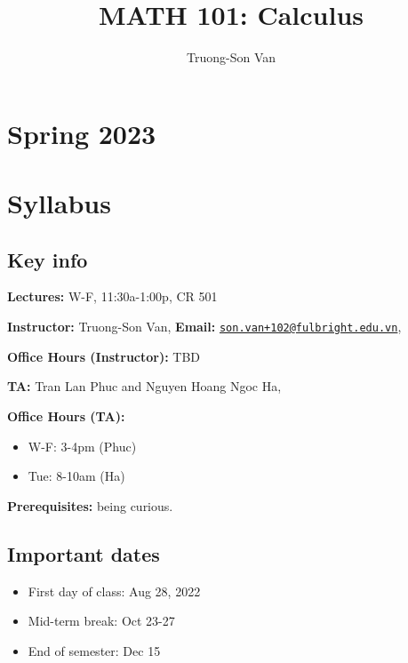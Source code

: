 \documentclass[
]{article}
\title{MATH 101: Calculus}
\author{Truong-Son Van}
\date{}
\providecommand{\tightlist}{%
  \setlength{\itemsep}{0pt}\setlength{\parskip}{0pt}}
\begin{document}
\maketitle

{
\setcounter{tocdepth}{2}
\tableofcontents
}
\hypertarget{spring-2023}{%
\section*{Spring 2023}\label{spring-2023}}

\hypertarget{syllabus}{%
\section*{Syllabus}\label{syllabus}}

\hypertarget{key-info}{%
\subsection*{Key info}\label{key-info}}

\textbf{Lectures:} W-F, 11:30a-1:00p, CR 501

\textbf{Instructor:} Truong-Son Van, \textbf{Email:} \href{mailto:son.van+102@fulbright.edu.vn}{\nolinkurl{son.van+102@fulbright.edu.vn}},

\textbf{Office Hours (Instructor):} TBD

\textbf{TA:} Tran Lan Phuc and Nguyen Hoang Ngoc Ha,

\textbf{Office Hours (TA):}

\begin{itemize}
\item
  W-F: 3-4pm (Phuc)
\item
  Tue: 8-10am (Ha)
\end{itemize}

\textbf{Prerequisites:} being curious.

\hypertarget{important-dates}{%
\subsection*{Important dates}\label{important-dates}}

\begin{itemize}
\tightlist
\item
  First day of class: Aug 28, 2022
\item
  Mid-term break: Oct 23-27
\item
  End of semester: Dec 15
\end{itemize}
\end{document}
